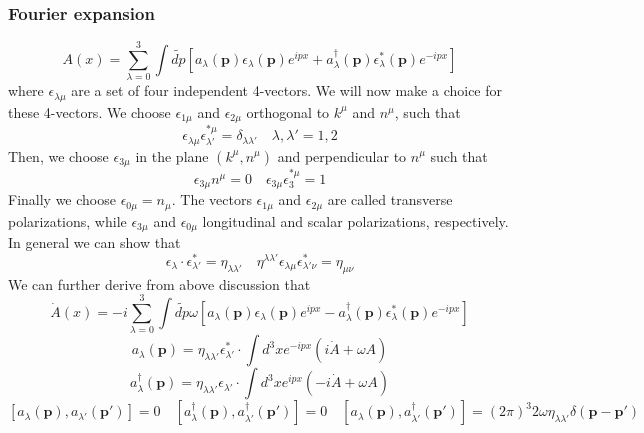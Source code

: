 \subsubsection{Fourier expansion}
\[A(x) = \sum_{\lambda=0}^{3} \int \widetilde{dp} [a_{\lambda}(\bm{p}) \epsilon_{\lambda}(\bm{p})e^{ipx} + a^{\dagger}_{\lambda}(\bm{p}) \epsilon^*_{\lambda}(\bm{p})e^{-ipx}]\]
where $\epsilon_{\lambda \mu}$ are a set of four independent 4-vectors.  We will now make a choice for these 4-vectors. We choose $\epsilon_{1\mu}$ and $\epsilon_{2\mu}$ orthogonal to $k^{\mu}$ and $n^{\mu}$, such that
\[\epsilon_{\lambda \mu} \epsilon^{*\mu}_{\lambda'} = \delta_{\lambda \lambda'} \quad \lambda,\lambda' = 1,2\]
Then, we choose $\epsilon_{3\mu}$ in the plane $(k^{\mu},n^{\mu})$ and perpendicular to $n^{\mu}$ such that
\[\epsilon_{3\mu} n^{\mu} = 0 \quad \epsilon_{3\mu} \epsilon^{*\mu}_{3} = 1\]
Finally we choose $\epsilon_{0\mu} = n_{\mu}$. The vectors $\epsilon_{1\mu}$ and $\epsilon_{2\mu}$ are called transverse polarizations, while $\epsilon_{3\mu}$ and $\epsilon_{0\mu}$ longitudinal and scalar polarizations, respectively.\\
In general we can show that
\[\epsilon_{\lambda} \cdot \epsilon^*_{\lambda'} = \eta_{\lambda \lambda'} \quad \eta^{\lambda \lambda'} \epsilon_{\lambda \mu} \epsilon^*_{\lambda' \nu} = \eta_{\mu \nu} \]
We can further derive from above discussion that
\[\dot{A}(x) = -i \sum_{\lambda=0}^{3} \int \widetilde{dp} \omega [a_{\lambda}(\bm{p}) \epsilon_{\lambda}(\bm{p})e^{ipx} - a^{\dagger}_{\lambda}(\bm{p}) \epsilon^*_{\lambda}(\bm{p})e^{-ipx}]\]
\[ a_{\lambda}(\bm{p}) =  \eta_{\lambda \lambda'} \epsilon^*_{\lambda'} \cdot \int d^3x e^{-ipx}(i\dot{A}+\omega A)\]
\[ a^{\dagger}_{\lambda}(\bm{p}) =  \eta_{\lambda \lambda'} \epsilon_{\lambda'} \cdot \int d^3x e^{ipx}(-i\dot{A}+\omega A)\]
\[[a_{\lambda}(\bm{p}),a_{\lambda'}(\bm{p'})] = 0 \quad [a^{\dagger}_{\lambda}(\bm{p}),a^{\dagger}_{\lambda'}(\bm{p'})] = 0 \quad [a_{\lambda}(\bm{p}),a^{\dagger}_{\lambda'}(\bm{p'})] = (2\pi)^3 2\omega \eta_{\lambda \lambda'} \delta(\bm{p} - \bm{p}')\]


